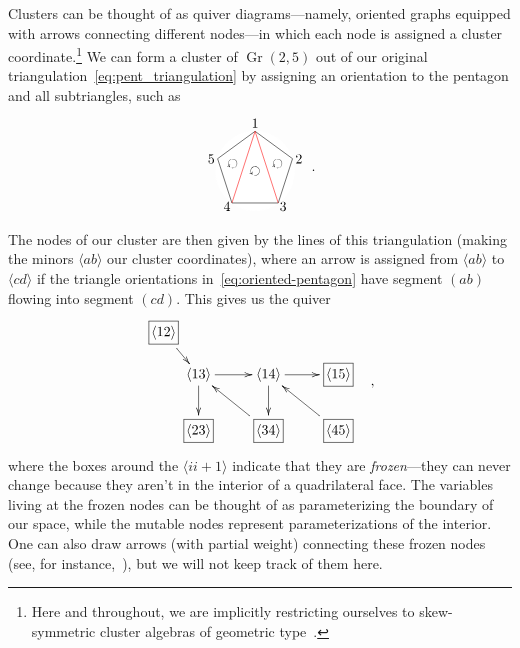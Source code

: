 \documentclass[11pt]{article}
\DeclareMathOperator{\Gr}{Gr}
\def\ket#1{\langle #1 \rangle}
\def\drawLabeledPentagon{
\coordinate (P1) at (90:1);
\coordinate (P2) at (18:1);
\coordinate (P3) at (306:1);
\coordinate (P4) at (234:1);
\coordinate (P5) at (162:1);
\draw[white,fill=white] (0,0) circle (1cm);
\draw (P1) -- (P2) -- (P3) -- (P4) -- (P5) -- cycle;
\draw (0,1.2) node {1};
\draw (.9,.3) node[anchor=west] {2};
\draw (.5,-.9) node[anchor=west] {3};
\draw (-.5,-.9) node[anchor=east] {4};
\draw (-.9,.3) node[anchor=east] {5};
}
\begin{document}
Clusters can be thought of as quiver diagrams---namely, oriented graphs equipped with arrows connecting different nodes---in which each node is assigned a cluster coordinate.\footnote{Here and throughout, we are implicitly restricting ourselves to skew-symmetric cluster algebras of geometric type~\cite{}.} We can form a cluster of $\Gr(2,5)$ out of our original triangulation~\eqref{eq:pent_triangulation} by assigning an orientation to the pentagon and all subtriangles, such as
\begin{equation}\label{eq:oriented-pentagon}
\begin{gathered}
\begin{tikzpicture}
  \drawLabeledPentagon
  \draw[color=red] (P1) -- (P3);
  \draw[color=red] (P1) -- (P4);
  \draw (18:.6) node[rotate=144] {$\circlearrowleft$};
  \draw (0:0) node[rotate=144] {$\circlearrowleft$};
  \draw (162:.6) node[rotate=144] {$\circlearrowleft$};
\end{tikzpicture} 
\end{gathered} \ .
\end{equation}
The nodes of our cluster are then given by the lines of this triangulation (making the minors $\ket{ab}$ our cluster coordinates), where an arrow is assigned from $\ket{ab}$ to $\ket{cd}$ if the triangle orientations in~\eqref{eq:oriented-pentagon} have segment $(ab)$ flowing into segment $(cd)$. This gives us the quiver
\begin{equation}\label{eq:gr25-seed}
\begin{gathered}
\begin{xy} 0;<1pt,0pt>:<0pt,-1pt>::
	(25,30) *+{\langle 13\rangle} ="0",
	(75,30) *+{\langle 14\rangle} ="1",
	(125,30) *+{\framebox[5ex]{$\langle 15\rangle$}} ="2",
	(125,70) *+{\framebox[5ex]{$\langle 45\rangle$}} ="3",
	(75,70) *+{\framebox[5ex]{$\langle 34\rangle$}} ="4",
	(25,70) *+{\framebox[5ex]{$\langle 23\rangle$}} ="5",
	(0,0) *+{\framebox[5ex]{$\langle 12\rangle$}} ="6",
	(145,75) *+{},
	"0", {\ar"1"},
	"4", {\ar"0"},
	"0", {\ar"5"},
	"6", {\ar"0"},
	"1", {\ar"2"},
	"3", {\ar"1"},
	"1", {\ar"4"},
\end{xy}
\end{gathered} ,
\end{equation}
where the boxes around the $\ket{ii+1}$ indicate that they are \emph{frozen}---they can never change because they aren't in the interior of a quadrilateral face. The variables living at the frozen nodes can be thought of as parameterizing the boundary of our space, while the mutable nodes represent parameterizations of the interior. One can also draw arrows (with partial weight) connecting these frozen nodes (see, for instance,~\cite{ArkaniHamed:2012nw}), but we will not keep track of them here. 
\end{document}
